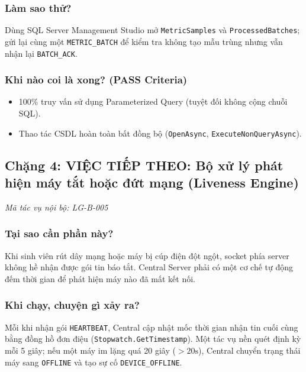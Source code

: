 \documentclass[12pt,a4paper]{article}
\begin{document}
\subsubsection{Làm sao thử?}
Dùng SQL Server Management Studio mở \texttt{MetricSamples} và \texttt{ProcessedBatches}; gửi lại cùng một \texttt{METRIC\_BATCH} để kiểm tra không tạo mẫu trùng nhưng vẫn nhận lại \texttt{BATCH\_ACK}.

\subsubsection{Khi nào coi là xong? (PASS Criteria)}
\begin{itemize}
  \item 100\% truy vấn sử dụng Parameterized Query (tuyệt đối không cộng chuỗi SQL).
  \item Thao tác CSDL hoàn toàn bất đồng bộ (\texttt{OpenAsync}, \texttt{ExecuteNonQueryAsync}).
\end{itemize}

\subsection{Chặng 4: VIỆC TIẾP THEO: Bộ xử lý phát hiện máy tắt hoặc đứt mạng (Liveness Engine)}
{\footnotesize\color{lgGray}\textit{Mã tác vụ nội bộ: LG-B-005}}\par
\vspace{2mm}

\subsubsection{Tại sao cần phần này?}
Khi sinh viên rút dây mạng hoặc máy bị cúp điện đột ngột, socket phía server không hề nhận được gói tin báo tắt. Central Server phải có một cơ chế tự động đếm thời gian để phát hiện máy nào đã mất kết nối.

\subsubsection{Khi chạy, chuyện gì xảy ra?}
Mỗi khi nhận gói \texttt{HEARTBEAT}, Central cập nhật mốc thời gian nhận tin cuối cùng bằng đồng hồ đơn điệu (\texttt{Stopwatch.GetTimestamp}). Một tác vụ nền quét định kỳ mỗi 5 giây; nếu một máy im lặng quá 20 giây ($> 20\text{s}$), Central chuyển trạng thái máy sang \texttt{OFFLINE} và tạo sự cố \texttt{DEVICE\_OFFLINE}.
\end{document}
